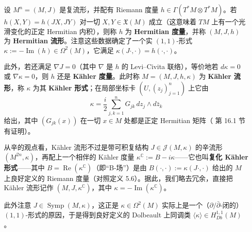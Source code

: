 
\begin{Def}\label{def:7.3}
设 $M^n=(M,J)$ 是复流形，并配有 Riemann 度量 $h\in\Gamma(T^*M\otimes T^*M)$。若 $h(X,Y)=h(JX,JY)$ 对一切 $X,Y\in\mathfrak X(M)$ 成立（这意味着 $TM$ 上有一个光滑变化的正定 Hermitian 内积），则称 $h$ 为 \textbf{Hermitian 度量}，并称 $(M,J,h)$ 为 \textbf{Hermitian 流形}。注意这些数据确定了一个实 $(1,1)$-形式 $\kappa:=-\operatorname{Im}(h)\in\Omega^2(M)$，它满足 $\kappa(J\cdot,\cdot)=h(\cdot,\cdot)$。

此外，若还满足 $\nabla J=0$（其中 $\nabla$ 是 $h$ 的 Levi–Civita 联络），等价地若 $d\kappa=0$ 或 $\nabla\kappa=0$，则 $h$ 还是 \textbf{Kähler 度量}。此时称 $M=(M,J,h,\kappa)$ 为 \textbf{Kähler 流形}，称 $\kappa$ 为其 \textbf{Kähler 形式}；在局部坐标卡 $(U,(z_j)_{j=1}^n)$ 上它由
\begin{equation}\label{eq:7.103}
\kappa=\frac{i}{2}\sum_{j,k=1}^{n}G_{jk}\,dz_j\wedge d\bar z_k
\end{equation}
给出，其中 $(G_{jk}(x))$ 在一切 $x\in M$ 处都是正定 Hermitian 矩阵（\cite{Sil12} 第 16.1 节有证明）。
\end{Def}

从辛的观点看，Kähler 流形不过是带可积复结构 $J\in\mathcal J(M,\kappa)$ 的辛流形 $(M^{2n},\kappa)$，再配上一个相伴的 Kähler 度量 $\kappa^{\mathbb C}:=B-i\kappa$——它也叫\textbf{复化 Kähler 形式}——其中 $B=\operatorname{Re}(\kappa^{\mathbb C})$（即“B-场”）是由 $B(\cdot,\cdot):=\kappa(J\cdot,\cdot)$ 给出的 $M$ 上良好定义的 Riemann 度量（对照定义 5.6）。据此，我们略去冗余，直接把 Kähler 流形记作 $(M,J,\kappa^{\mathbb C})$，其中 $\kappa=-\operatorname{Im}(\kappa^{\mathbb C})$。

此外注意 $J\in\operatorname{Symp}(M,\kappa)$，这正是 $\kappa\in\Omega^2(M)$ 实际上是一个（$\partial/\bar\partial$-闭的）$(1,1)$-形式的原因，于是得到良好定义的 Dolbeault 上同调类 $\langle\kappa\rangle\in H^{1,1}_{Db}(M)$。

